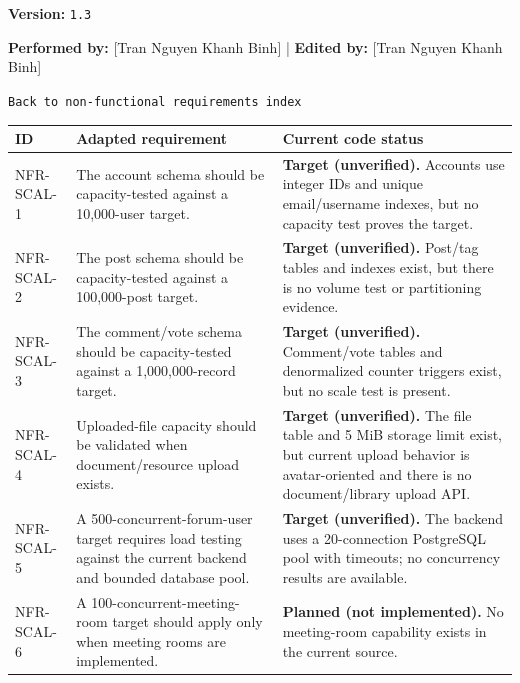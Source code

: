\documentclass[12pt]{article}
\renewcommand{\baselinestretch}{1.5}
\begin{document}
\textbf{Version:} \texttt{1.3}
\par\medskip

\textbf{Performed by:} [Tran Nguyen Khanh Binh] | \textbf{Edited by:} [Tran Nguyen Khanh Binh]
\par\medskip

\texttt{Back to non-functional requirements index}
\par\medskip

\begingroup
\small
\renewcommand{\baselinestretch}{1.0}\selectfont
\renewcommand{\arraystretch}{1.15}
\setlength{\tabcolsep}{6pt}
\begin{longtable}{|>{\raggedright\arraybackslash}p{}|>{\raggedright\arraybackslash}p{}|>{\raggedright\arraybackslash}p{}|}
\hline
\textbf{ID} & \textbf{Adapted requirement} & \textbf{Current code status} \\ \hline
\endhead
NFR-SCAL-1 & The account schema should be capacity-tested against a 10,000-user target. & \textbf{Target (unverified).} Accounts use integer IDs and unique email/username indexes, but no capacity test proves the target. \\ \hline
NFR-SCAL-2 & The post schema should be capacity-tested against a 100,000-post target. & \textbf{Target (unverified).} Post/tag tables and indexes exist, but there is no volume test or partitioning evidence. \\ \hline
NFR-SCAL-3 & The comment/vote schema should be capacity-tested against a 1,000,000-record target. & \textbf{Target (unverified).} Comment/vote tables and denormalized counter triggers exist, but no scale test is present. \\ \hline
NFR-SCAL-4 & Uploaded-file capacity should be validated when document/resource upload exists. & \textbf{Target (unverified).} The file table and 5 MiB storage limit exist, but current upload behavior is avatar-oriented and there is no document/library upload API. \\ \hline
NFR-SCAL-5 & A 500-concurrent-forum-user target requires load testing against the current backend and bounded database pool. & \textbf{Target (unverified).} The backend uses a 20-connection PostgreSQL pool with timeouts; no concurrency results are available. \\ \hline
NFR-SCAL-6 & A 100-concurrent-meeting-room target should apply only when meeting rooms are implemented. & \textbf{Planned (not implemented).} No meeting-room capability exists in the current source. \\ \hline
\end{longtable}
\endgroup
\par\medskip
\end{document}
